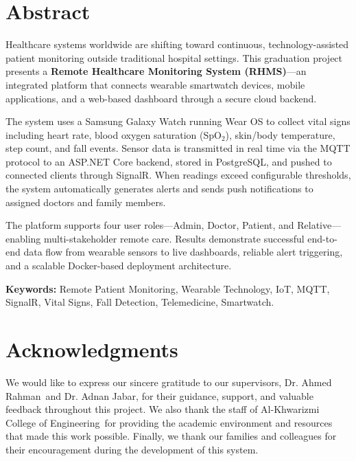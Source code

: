 \documentclass[12pt,a4paper]{report}
\newcommand{\College}{Al-Khwarizmi College of Engineering}
\newcommand{\SupervisorOne}{Dr. Ahmed Rahman}
\newcommand{\SupervisorTwo}{Dr. Adnan Jabar}
\begin{document}
\setcounter{page}{1}

\chapter*{Abstract}

Healthcare systems worldwide are shifting toward continuous, technology-assisted patient monitoring outside traditional hospital settings. This graduation project presents a \textbf{Remote Healthcare Monitoring System (RHMS)}---an integrated platform that connects wearable smartwatch devices, mobile applications, and a web-based dashboard through a secure cloud backend.

The system uses a Samsung Galaxy Watch running Wear OS to collect vital signs including heart rate, blood oxygen saturation (SpO$_2$), skin/body temperature, step count, and fall events. Sensor data is transmitted in real time via the MQTT protocol to an ASP.NET Core backend, stored in PostgreSQL, and pushed to connected clients through SignalR. When readings exceed configurable thresholds, the system automatically generates alerts and sends push notifications to assigned doctors and family members.

The platform supports four user roles---Admin, Doctor, Patient, and Relative---enabling multi-stakeholder remote care. Results demonstrate successful end-to-end data flow from wearable sensors to live dashboards, reliable alert triggering, and a scalable Docker-based deployment architecture.

\vspace{0.5cm}
\noindent\textbf{Keywords:} Remote Patient Monitoring, Wearable Technology, IoT, MQTT, SignalR, Vital Signs, Fall Detection, Telemedicine, Smartwatch.

\chapter*{Acknowledgments}

We would like to express our sincere gratitude to our supervisors, \SupervisorOne\ and \SupervisorTwo, for their guidance, support, and valuable feedback throughout this project. We also thank the staff of \College\ for providing the academic environment and resources that made this work possible. Finally, we thank our families and colleagues for their encouragement during the development of this system.
\end{document}
